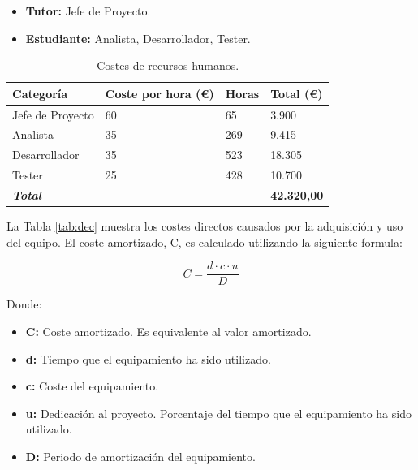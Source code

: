 \begin{itemize}

\item \textbf{Tutor:} Jefe de Proyecto.

\item \textbf{Estudiante:} Analista, Desarrollador, Tester.

\end{itemize} 

\begin{center}
\begin{table}[htbp]
\centering
\begin{tabular}{@{}p{3cm} R{3.5cm} R{2.2cm} R{2.4cm}@{}} 
\toprule
\textbf{Categoría} & \textbf{Coste por hora (\euro)} & \textbf{Horas} & \textbf{Total (\euro)} \\
\midrule
Jefe de Proyecto					& 60 						& 65			& 3.900 \\
Analista			 				& 35							& 269		& 9.415 \\
Desarrollador		 				& 35							& 523		& 18.305 \\
Tester		 					& 25							& 428		& 10.700 \\
\midrule
\textbf{\textit{Total}}			&							&			& \textbf{42.320,00}\\
\bottomrule
\end{tabular}
\caption{Costes de recursos humanos.}
\label{tab:dhrc}
\end{table}
\end{center}

La Tabla \ref{tab:dec} muestra los costes directos causados por la adquisición y uso del equipo. El coste amortizado, C, es calculado utilizando la siguiente formula:

\begin{equation}
  C = \frac{d \cdot c \cdot u}{D}
\label{eq:costs}
\end{equation}

Donde:

\begin{itemize}

\item \textbf{C:} Coste amortizado. Es equivalente al valor amortizado.

\item \textbf{d:} Tiempo que el equipamiento ha sido utilizado.

\item \textbf{c:} Coste del equipamiento. 

\item \textbf{u:} Dedicación al proyecto. Porcentaje del tiempo que el equipamiento ha sido utilizado.

\item \textbf{D:} Periodo de amortización del equipamiento.

\end{itemize}

